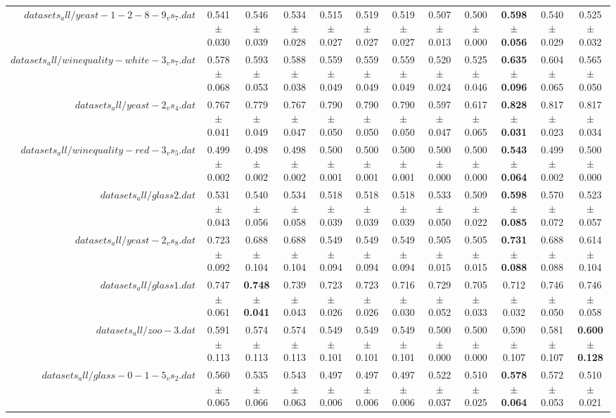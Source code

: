 \begin{table}[!ht]
{\begin{tabular}{r c c c c c c c c c c c}
$datasets_all/yeast-1-2-8-9_vs_7.dat$ & 0.541 $\pm$ 0.030 & 0.546 $\pm$ 0.039 & 0.534 $\pm$ 0.028 & 0.515 $\pm$ 0.027 & 0.519 $\pm$ 0.027 & 0.519 $\pm$ 0.027 & 0.507 $\pm$ 0.013 & 0.500 $\pm$ 0.000 & \textbf{0.598 $\pm$ 0.056} & 0.540 $\pm$ 0.029 & 0.525 $\pm$ 0.032 \\
$datasets_all/winequality-white-3_vs_7.dat$ & 0.578 $\pm$ 0.068 & 0.593 $\pm$ 0.053 & 0.588 $\pm$ 0.038 & 0.559 $\pm$ 0.049 & 0.559 $\pm$ 0.049 & 0.559 $\pm$ 0.049 & 0.520 $\pm$ 0.024 & 0.525 $\pm$ 0.046 & \textbf{0.635 $\pm$ 0.096} & 0.604 $\pm$ 0.065 & 0.565 $\pm$ 0.050 \\
$datasets_all/yeast-2_vs_4.dat$ & 0.767 $\pm$ 0.041 & 0.779 $\pm$ 0.049 & 0.767 $\pm$ 0.047 & 0.790 $\pm$ 0.050 & 0.790 $\pm$ 0.050 & 0.790 $\pm$ 0.050 & 0.597 $\pm$ 0.047 & 0.617 $\pm$ 0.065 & \textbf{0.828 $\pm$ 0.031} & 0.817 $\pm$ 0.023 & 0.817 $\pm$ 0.034 \\
$datasets_all/winequality-red-3_vs_5.dat$ & 0.499 $\pm$ 0.002 & 0.498 $\pm$ 0.002 & 0.498 $\pm$ 0.002 & 0.500 $\pm$ 0.001 & 0.500 $\pm$ 0.001 & 0.500 $\pm$ 0.001 & 0.500 $\pm$ 0.000 & 0.500 $\pm$ 0.000 & \textbf{0.543 $\pm$ 0.064} & 0.499 $\pm$ 0.002 & 0.500 $\pm$ 0.000 \\
$datasets_all/glass2.dat$ & 0.531 $\pm$ 0.043 & 0.540 $\pm$ 0.056 & 0.534 $\pm$ 0.058 & 0.518 $\pm$ 0.039 & 0.518 $\pm$ 0.039 & 0.518 $\pm$ 0.039 & 0.533 $\pm$ 0.050 & 0.509 $\pm$ 0.022 & \textbf{0.598 $\pm$ 0.085} & 0.570 $\pm$ 0.072 & 0.523 $\pm$ 0.057 \\
$datasets_all/yeast-2_vs_8.dat$ & 0.723 $\pm$ 0.092 & 0.688 $\pm$ 0.104 & 0.688 $\pm$ 0.104 & 0.549 $\pm$ 0.094 & 0.549 $\pm$ 0.094 & 0.549 $\pm$ 0.094 & 0.505 $\pm$ 0.015 & 0.505 $\pm$ 0.015 & \textbf{0.731 $\pm$ 0.088} & 0.688 $\pm$ 0.088 & 0.614 $\pm$ 0.104 \\
$datasets_all/glass1.dat$ & 0.747 $\pm$ 0.061 & \textbf{0.748 $\pm$ 0.041} & 0.739 $\pm$ 0.043 & 0.723 $\pm$ 0.026 & 0.723 $\pm$ 0.026 & 0.716 $\pm$ 0.030 & 0.729 $\pm$ 0.052 & 0.705 $\pm$ 0.033 & 0.712 $\pm$ 0.032 & 0.746 $\pm$ 0.050 & 0.746 $\pm$ 0.058 \\
$datasets_all/zoo-3.dat$ & 0.591 $\pm$ 0.113 & 0.574 $\pm$ 0.113 & 0.574 $\pm$ 0.113 & 0.549 $\pm$ 0.101 & 0.549 $\pm$ 0.101 & 0.549 $\pm$ 0.101 & 0.500 $\pm$ 0.000 & 0.500 $\pm$ 0.000 & 0.590 $\pm$ 0.107 & 0.581 $\pm$ 0.107 & \textbf{0.600 $\pm$ 0.128} \\
$datasets_all/glass-0-1-5_vs_2.dat$ & 0.560 $\pm$ 0.065 & 0.535 $\pm$ 0.066 & 0.543 $\pm$ 0.063 & 0.497 $\pm$ 0.006 & 0.497 $\pm$ 0.006 & 0.497 $\pm$ 0.006 & 0.522 $\pm$ 0.037 & 0.510 $\pm$ 0.025 & \textbf{0.578 $\pm$ 0.064} & 0.572 $\pm$ 0.053 & 0.510 $\pm$ 0.021 \\

\end{tabular}}
\end{table}
